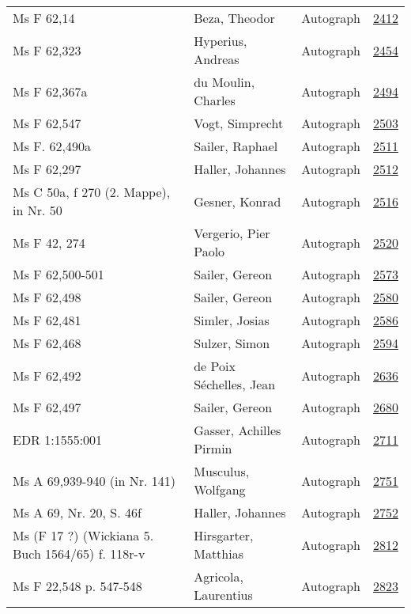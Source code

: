 \documentclass[10pt,a4paper,landscape]{report}
\begin{document}
\begin{longtable}{p{16cm}p{4cm}lr}
Ms F 62,14	&	Beza, Theodor	&	Autograph	&	\href{http://130.60.24.72/assignment/2412}{2412}\\
Ms F 62,323	&	Hyperius, Andreas	&	Autograph	&	\href{http://130.60.24.72/assignment/2454}{2454}\\
Ms F 62,367a	&	du Moulin, Charles	&	Autograph	&	\href{http://130.60.24.72/assignment/2494}{2494}\\
Ms F 62,547	&	Vogt, Simprecht	&	Autograph	&	\href{http://130.60.24.72/assignment/2503}{2503}\\
Ms F. 62,490a	&	Sailer, Raphael	&	Autograph	&	\href{http://130.60.24.72/assignment/2511}{2511}\\
Ms F 62,297	&	Haller, Johannes	&	Autograph	&	\href{http://130.60.24.72/assignment/2512}{2512}\\
Ms C 50a, f 270 (2. Mappe), in Nr. 50	&	Gesner, Konrad	&	Autograph	&	\href{http://130.60.24.72/assignment/2516}{2516}\\
Ms F 42, 274	&	Vergerio, Pier Paolo	&	Autograph	&	\href{http://130.60.24.72/assignment/2520}{2520}\\
Ms F 62,500-501	&	Sailer, Gereon	&	Autograph	&	\href{http://130.60.24.72/assignment/2573}{2573}\\
Ms F 62,498	&	Sailer, Gereon	&	Autograph	&	\href{http://130.60.24.72/assignment/2580}{2580}\\
Ms F 62,481	&	Simler, Josias	&	Autograph	&	\href{http://130.60.24.72/assignment/2586}{2586}\\
Ms F 62,468	&	Sulzer, Simon	&	Autograph	&	\href{http://130.60.24.72/assignment/2594}{2594}\\
Ms F 62,492	&	de Poix Séchelles, Jean	&	Autograph	&	\href{http://130.60.24.72/assignment/2636}{2636}\\
Ms F 62,497	&	Sailer, Gereon	&	Autograph	&	\href{http://130.60.24.72/assignment/2680}{2680}\\
EDR 1:1555:001	&	Gasser, Achilles Pirmin	&	Autograph	&	\href{http://130.60.24.72/assignment/2711}{2711}\\
Ms A 69,939-940 (in Nr. 141)	&	Musculus, Wolfgang	&	Autograph	&	\href{http://130.60.24.72/assignment/2751}{2751}\\
Ms A 69, Nr. 20, S. 46f	&	Haller, Johannes	&	Autograph	&	\href{http://130.60.24.72/assignment/2752}{2752}\\
Ms (F 17 ?) (Wickiana 5. Buch 1564/65) f. 118r-v	&	Hirsgarter, Matthias	&	Autograph	&	\href{http://130.60.24.72/assignment/2812}{2812}\\
Ms F 22,548 p. 547-548	&	Agricola, Laurentius	&	Autograph	&	\href{http://130.60.24.72/assignment/2823}{2823}\\

\end{longtable}
\end{document}
